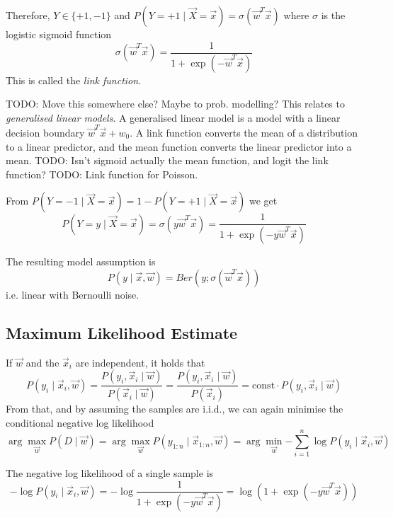 Therefore, $Y \in \{+1, -1\}$ and
$P(Y = +1 \mid \vec{X} = \vec{x}) = \sigma(\vec{w}^T \vec{x})$
where $\sigma$ is the logistic sigmoid function
\begin{equation*}
\sigma(\vec{w}^T \vec{x})
= \frac{1}{1 + \exp{(-\vec{w}^T \vec{x})}}
\end{equation*}
This is called the \emph{link function}.

TODO: Move this somewhere else? Maybe to prob. modelling?
This relates to \emph{generalised linear models}.
A generalised linear model is a model with
a linear decision boundary $\vec{w}^T \vec{x} + w_0$.
A link function converts the mean
of a distribution to a linear predictor,
and the mean function converts the linear
predictor into a mean.
TODO: Isn't sigmoid actually the mean function,
and logit the link function?
TODO: Link function for Poisson.

From $P(Y = -1 \mid \vec{X} = \vec{x}) = 1 - P(Y = +1 \mid \vec{X} = \vec{x})$ we get
\begin{equation*}
P(Y = y \mid \vec{X} = \vec{x})
= \sigma(y \vec{w}^T \vec{x})
= \frac{1}{1 + \exp{(-y \vec{w}^T \vec{x})}}
\end{equation*}

The resulting model assumption is
\begin{equation*}
P(y \mid \vec{x}, \vec{w}) = Ber(y; \sigma(\vec{w}^T \vec{x}))
\end{equation*}
i.e. linear with Bernoulli noise.


\subsection{Maximum Likelihood Estimate}
If $\vec{w}$ and the $\vec{x}_i$ are independent,
it holds that
\begin{equation*}
P(y_i \mid \vec{x}_i, \vec{w})
= \frac{P(y_i, \vec{x}_i \mid \vec{w})}{P(\vec{x}_i \mid \vec{w})}
= \frac{P(y_i, \vec{x}_i \mid \vec{w})}{P(\vec{x}_i)}
= \text{const} \cdot P(y_i, \vec{x}_i \mid \vec{w})
\end{equation*}
From that, and by assuming the samples are i.i.d.,
we can again minimise the conditional negative log likelihood
\begin{equation*}
\arg\max_{\vec{w}}{P(D \mid \vec{w})}
= \arg\max_{\vec{w}}{P(y_{1:n} \mid \vec{x}_{1:n}, \vec{w})}
= \arg\min_{\vec{w}}{-\sum_{i=1}^n{
		\log{P(y_i \mid \vec{x}_i, \vec{w})}
}}
\end{equation*}

The negative log likelihood of a single sample is
\begin{equation*}
-\log{P(y_i \mid \vec{x}_i, \vec{w})}
= -\log{\frac{1}{1 + \exp{(-y \vec{w}^T \vec{x})}}}
= \log{(1 + \exp{(-y \vec{w}^T \vec{x})})}
\end{equation*}

